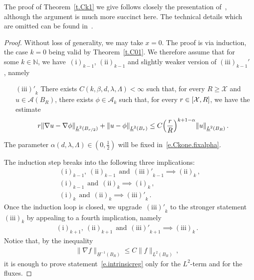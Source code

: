 \documentclass[11pt]{article} %
\numberwithin{equation}{section}
\theoremstyle{definition}
\let\originalleft\left
\let\originalright\right
\renewcommand{\left}{\mathopen{}\mathclose\bgroup\originalleft}
\renewcommand{\right}{\aftergroup\egroup\originalright}
\newcommand*{\N}{\ensuremath{\mathbb{N}}}
\newcommand*{\Rd}{\ensuremath{\mathbb{R}^d}}
\newcommand{\X}{\mathcal{X}}
\newcommand{\A}{\mathcal{A}}
\begin{document}
The proof of Theorem~\ref{t.Ck1} we give follows closely the presentation of~\cite[Proof of Theorem 3.8]{AKMBook}, although the argument is much more succinct here. The technical details which are omitted can be found in~\cite{AKMBook}.

\begin{proof} 
Without loss of generality, we may take $x=0$. The proof is via induction, the case $k=0$ being valid by Theorem~\ref{t.C01}. We therefore assume that for some $k\in\N$, we have~$\mathrm{(i)}_{k-1}$, $\mathrm{(ii)}_{k-1}$ and slightly weaker version of $\mathrm{(iii)}_{k-1}'$, namely
\begin{enumerate}
\item[{$\mathrm{(iii)'}_k$}]
There exists $C(k,\beta,d,\lambda,\Lambda)<\infty$ such that, for every $R\geq \X$ and $u\in \A(B_R)$, there exists $\phi \in \A_k$ such that, for every $r \in \left[ \X, R \right]$, we have the estimate
\begin{equation}
\label{e.intrinsicreg.prime}
r \left\| \nabla u - \nabla \phi \right\|_{\underline{L}^2(B_{r/2})}  
+ 
\left\| u - \phi \right\|_{\underline{L}^2(B_r)} 
\leq 
C \left( \frac r R \right)^{k+1-\alpha} %
\left\| u \right\|_{\underline{L}^2(B_R)} \, .
\end{equation}
\end{enumerate}
The parameter $\alpha(d,\lambda,\Lambda) \in (0,\frac12)$ will be fixed in~\eqref{e.Ckone.fixalpha}.  

\smallskip

The induction step breaks into the following three implications:
\begin{align}   
\label{e.ind1}
& \mathrm{(i)}_{k-1}, \ \mathrm{(ii)}_{k-1} \ \ \text{and} \ \ \mathrm{(iii)'}_{k-1}  \implies \mathrm{(ii)}_{k}
\,,
\\ 
\label{e.ind2}
& \mathrm{(i)}_{k-1} \ \ \text{and} \ \ \mathrm{(ii)}_{k}   \implies \mathrm{(i)}_{k}
\,, \\ 
\label{e.ind3}
& \mathrm{(i)}_{k}\ \ \text{and} \ \ \mathrm{(ii)}_{k}  \implies \mathrm{(iii)'}_{k}
\,.
\end{align}
Once the induction loop is closed, we upgrade~$\mathrm{(iii)'}_{k}$ to the stronger statement~$\mathrm{(iii)}_{k}$ by appealing to a fourth implication, namely 
\begin{align}
\label{e.ind4}
\mathrm{(i)}_{k+1}, \ \mathrm{(ii)}_{k+1} \ \ \text{and} \ \ \mathrm{(iii)'}_{k+1}  \implies \mathrm{(iii)}_{k}
\,.
\end{align}
Notice that, by the inequality 
\begin{align*}  
\| \nabla f \|_{\underline{H}^{-1}(B_R)} \leq C  \|  f \|_{\underline{L}^{2}(B_R)} 
\,,
\end{align*}
it is enough to prove statement~\eqref{e.intrinsicreg} only for the $L^2$-term and for the fluxes. 


\end{proof}
\end{document}
